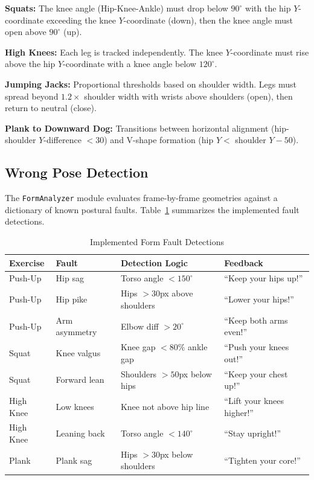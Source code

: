 \documentclass[conference]{IEEEtran}
\begin{document}
\textbf{Squats:} The knee angle (Hip-Knee-Ankle) must drop below $90^\circ$ with the hip $Y$-coordinate exceeding the knee $Y$-coordinate (down), then the knee angle must open above $90^\circ$ (up).

\textbf{High Knees:} Each leg is tracked independently. The knee $Y$-coordinate must rise above the hip $Y$-coordinate with a knee angle below $120^\circ$.

\textbf{Jumping Jacks:} Proportional thresholds based on shoulder width. Legs must spread beyond $1.2\times$ shoulder width with wrists above shoulders (open), then return to neutral (close).

\textbf{Plank to Downward Dog:} Transitions between horizontal alignment (hip-shoulder $Y$-difference $< 30$) and V-shape formation (hip $Y <$ shoulder $Y - 50$).

\subsection{Wrong Pose Detection}

The \texttt{FormAnalyzer} module evaluates frame-by-frame geometries against a dictionary of known postural faults. Table~\ref{tab:faults} summarizes the implemented fault detections.

\begin{table}[htbp]
\caption{Implemented Form Fault Detections}
\begin{center}
\begin{tabular}{|p{1.2cm}|p{1.5cm}|p{2.2cm}|p{1.8cm}|}
\hline
\textbf{Exercise} & \textbf{Fault} & \textbf{Detection Logic} & \textbf{Feedback} \\
\hline
Push-Up & Hip sag & Torso angle $< 150^\circ$ & ``Keep your hips up!'' \\
\hline
Push-Up & Hip pike & Hips $> 30$px above shoulders & ``Lower your hips!'' \\
\hline
Push-Up & Arm asymmetry & Elbow diff $> 20^\circ$ & ``Keep both arms even!'' \\
\hline
Squat & Knee valgus & Knee gap $< 80\%$ ankle gap & ``Push your knees out!'' \\
\hline
Squat & Forward lean & Shoulders $> 50$px below hips & ``Keep your chest up!'' \\
\hline
High Knee & Low knees & Knee not above hip line & ``Lift your knees higher!'' \\
\hline
High Knee & Leaning back & Torso angle $< 140^\circ$ & ``Stay upright!'' \\
\hline
Plank & Plank sag & Hips $> 30$px below shoulders & ``Tighten your core!'' \\
\hline
\end{tabular}
\label{tab:faults}
\end{center}
\end{table}
\end{document}
